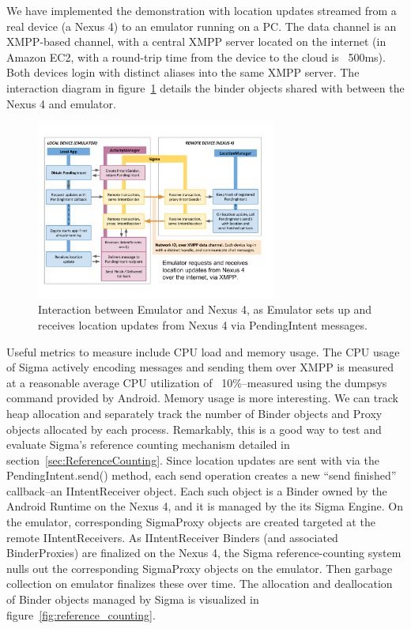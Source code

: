 \documentclass[prodmode]{acmlarge}
\begin{document}
We have implemented the demonstration with location updates streamed from a real device (a Nexus 4) to an emulator running on a PC. The data channel is an XMPP-based channel, with a central XMPP server located on the internet (in Amazon EC2, with a round-trip time from the device to the cloud is ~500ms). Both devices login with distinct aliases into the same XMPP server. The interaction diagram in figure~\ref{fig:LocationUpdateInteraction} details the binder objects shared with between the Nexus 4 and emulator.

\begin{figure}[h]
\centering
\includegraphics[width=0.7\textwidth]{drawings/LocationPendingIntentExample.pdf}
\caption{Interaction between Emulator and Nexus 4, as Emulator sets up and receives location updates from Nexus 4 via PendingIntent messages.}
\label{fig:LocationUpdateInteraction}
\end{figure}

Useful metrics to measure include CPU load and memory usage. The CPU usage of Sigma actively encoding messages and sending them over XMPP is measured at a reasonable average CPU utilization of ~10\%--measured using the dumpsys command provided by Android. Memory usage is more interesting. We can track heap allocation and separately track the number of Binder objects and Proxy objects allocated by each process. Remarkably, this is a good way to test and evaluate Sigma's reference counting mechanism detailed in section~\ref{sec:ReferenceCounting}. Since location updates are sent with via the PendingIntent.send() method, each send operation creates a new ``send finished'' callback--an IIntentReceiver object. Each such object is a Binder owned by the Android Runtime on the Nexus 4, and it is managed by the its Sigma Engine. On the emulator, corresponding SigmaProxy objects are created targeted at the remote IIntentReceivers. As IIntentReceiver Binders (and associated BinderProxies) are finalized on the Nexus 4, the Sigma reference-counting system nulls out the corresponding SigmaProxy objects on the emulator. Then garbage collection on emulator finalizes these over time. The allocation and deallocation of Binder objects managed by Sigma is visualized in figure~\ref{fig:reference_counting}.
\end{document}
